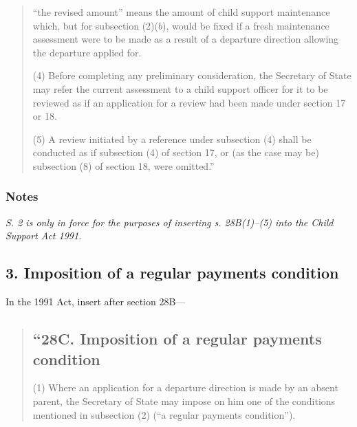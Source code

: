 \documentclass[a4paper]{article}
\newcommand\amendment[1]{\subsubsection*{Notes}{\itshape\frenchspacing\footnotesize #1 \par}}
\begin{document}
{\begin{quotation}
\begin{enumerate}
    “the revised amount” means the amount of child support maintenance which, but for subsection (2)($b$), would be fixed if a fresh maintenance assessment were to be made as a result of a departure direction allowing the departure applied for. 
\end{enumerate}

(4) Before completing any preliminary consideration, the Secretary of State may refer the current assessment to a child support officer for it to be reviewed as if an application for a review had been made under section 17 or 18.

(5) A review initiated by a reference under subsection (4) shall be conducted as if subsection (4) of section 17, or (as the case may be) subsection (8) of section 18, were omitted.''
%
%
\end{quotation}

\amendment{
S. 2 is only in force for the purposes of inserting s. 28B(1)--(5) into the Child Support Act 1991.
}

\subsection{3. Imposition of a regular payments condition}

In the 1991 Act, insert after section 28B—
\begin{quotation}
\subsection*{“28C. Imposition of a regular payments condition}

(1) Where an application for a departure direction is made by an absent parent, the Secretary of State may impose on him one of the conditions mentioned in subsection (2) (“a regular payments condition”).


\end{quotation}}
\end{document}
